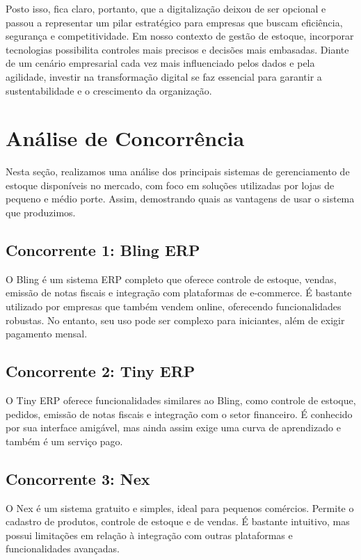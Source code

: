 \documentclass[
	12pt,				%
	openany,			%
	twoside,			%
	a4paper,			%
	english,			%
	brazil				%
	]{abntex2}
\begin{document}
Posto isso, fica claro, portanto, que a digitalização deixou de ser opcional e passou a representar um pilar estratégico para empresas que buscam eficiência, segurança e competitividade. Em nosso contexto de gestão de estoque, incorporar tecnologias possibilita controles mais precisos e decisões mais embasadas. Diante de um cenário empresarial cada vez mais influenciado pelos dados e pela agilidade, investir na transformação digital se faz essencial para garantir a sustentabilidade e o crescimento da organização.

\section{Análise de Concorrência}

Nesta seção, realizamos uma análise dos principais sistemas de gerenciamento de estoque disponíveis no mercado, com foco em soluções utilizadas por lojas de pequeno e médio porte. Assim, demostrando quais as vantagens de usar o sistema que produzimos.

\subsection{Concorrente 1: Bling ERP}
O Bling é um sistema ERP completo que oferece controle de estoque, vendas, emissão de notas fiscais e integração com plataformas de e-commerce. É bastante utilizado por empresas que também vendem online, oferecendo funcionalidades robustas. No entanto, seu uso pode ser complexo para iniciantes, além de exigir pagamento mensal.

\subsection{Concorrente 2: Tiny ERP}
O Tiny ERP oferece funcionalidades similares ao Bling, como controle de estoque, pedidos, emissão de notas fiscais e integração com o setor financeiro. É conhecido por sua interface amigável, mas ainda assim exige uma curva de aprendizado e também é um serviço pago.

\subsection{Concorrente 3: Nex}
O Nex é um sistema gratuito e simples, ideal para pequenos comércios. Permite o cadastro de produtos, controle de estoque e de vendas. É bastante intuitivo, mas possui limitações em relação à integração com outras plataformas e funcionalidades avançadas.
\end{document}
